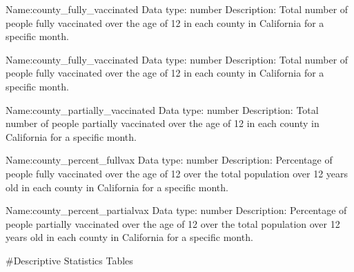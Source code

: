 \documentclass[
]{article}
\newenvironment{Shaded}{\begin{snugshade}}{\end{snugshade}}
\newcommand{\DataTypeTok}[1]{\textcolor[rgb]{0.13,0.29,0.53}{#1}}
\newcommand{\KeywordTok}[1]{\textcolor[rgb]{0.13,0.29,0.53}{\textbf{#1}}}
\newcommand{\NormalTok}[1]{#1}
\newcommand{\OperatorTok}[1]{\textcolor[rgb]{0.81,0.36,0.00}{\textbf{#1}}}
\newcommand{\StringTok}[1]{\textcolor[rgb]{0.31,0.60,0.02}{#1}}
\begin{document}
Name:county\_fully\_vaccinated Data type: number Description: Total
number of people fully vaccinated over the age of 12 in each county in
California for a specific month.

Name:county\_fully\_vaccinated Data type: number Description: Total
number of people fully vaccinated over the age of 12 in each county in
California for a specific month.

Name:county\_partially\_vaccinated Data type: number Description: Total
number of people partially vaccinated over the age of 12 in each county
in California for a specific month.

Name:county\_percent\_fullvax Data type: number Description: Percentage
of people fully vaccinated over the age of 12 over the total population
over 12 years old in each county in California for a specific month.

Name:county\_percent\_partialvax Data type: number Description:
Percentage of people partially vaccinated over the age of 12 over the
total population over 12 years old in each county in California for a
specific month.

\newpage

\#Descriptive Statistics Tables

\begin{Shaded}
\end{Shaded}

\begin{Shaded}
\end{Shaded}
\end{document}
